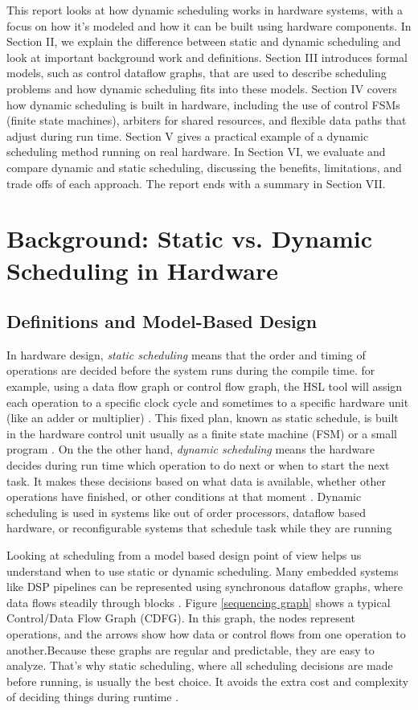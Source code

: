 \documentclass[conference]{IEEEtran}
\begin{document}
This report looks at how dynamic scheduling works in hardware systems, with a focus on how it's modeled and how it can be built using hardware components. In Section II, we explain the difference between static and dynamic scheduling and look at important background work and definitions. Section III introduces formal models, such as control dataflow graphs, that are used to describe scheduling problems and how dynamic scheduling fits into these models. Section IV covers how dynamic scheduling is built in hardware, including the use of control FSMs (finite state machines), arbiters for shared resources, and flexible data paths that adjust during run time. Section V gives a practical example of a dynamic scheduling method running on real hardware.  In Section VI, we evaluate and compare dynamic and static scheduling, discussing the benefits, limitations, and trade offs of each approach. The report ends with a summary in Section VII.

\section{Background: Static vs. Dynamic Scheduling in Hardware}

\subsection{Definitions and Model-Based Design}

In hardware design, \textit{static scheduling } means that the order and timing of operations are decided before the system runs during the compile time. for example, using a data flow graph or control flow graph, the HSL tool will assign each operation to a specific clock cycle and sometimes to a specific hardware unit (like an adder or multiplier) \cite{Ha2017}. This fixed plan, known as static schedule, is built in the hardware control unit usually as a finite state machine (FSM) or a small program \cite{Ha2017}. On the the other hand, \textit{ dynamic scheduling } means the hardware decides during run time which operation to do next or when to start the next task. It makes these decisions based on what data is available, whether other operations have finished, or other conditions at that moment \cite{DeMicheli1994}. Dynamic scheduling is used in systems like out of order processors, dataflow based hardware, or reconfigurable systems that schedule task while they are running \cite{Scheffer2016}

Looking at scheduling from a model based design point of view helps us understand when to use static or dynamic scheduling. Many embedded systems like DSP pipelines can be represented using synchronous dataflow graphs, where data flows steadily through blocks \cite{Ha2017,Scheffer2016}. Figure \ref{sequencing graph} shows a typical Control/Data Flow Graph (CDFG). In this graph, the nodes represent operations, and the arrows show how data or control flows from one operation to another.Because these graphs are regular and predictable, they are easy to analyze. That’s why static scheduling, where all scheduling decisions are made before running, is usually the best choice. It avoids the extra cost and complexity of deciding things during runtime \cite{Ha2017}.
\end{document}
